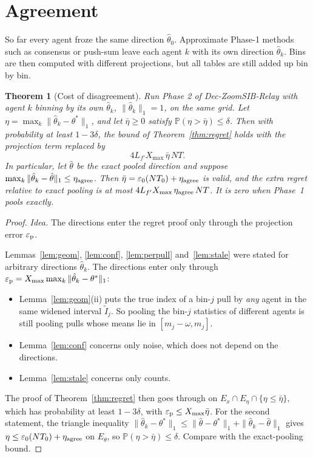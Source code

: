 \documentclass[11pt]{article}
\newtheorem{theorem}{Theorem}
\theoremstyle{definition}
\newcommand{\Prob}{\mathbb{P}}
\newcommand{\Xmax}{X_{\max}}
\newcommand{\eps}{\varepsilon}
\begin{document}
\section{Agreement}\label{sec:agree}

So far every agent froze the same direction $\hat\theta_0$. Approximate Phase-1 methods such as consensus or
push-sum leave each agent $k$ with its own direction $\hat\theta_k$. Bins are then computed with different
projections, but all tables are still added up bin by bin.

\begin{theorem}[Cost of disagreement]\label{thm:agree}
Run Phase 2 of Dec-ZoomSIB-Relay with agent $k$ binning by its own $\hat\theta_k$, $\|\hat\theta_k\|_1=1$, on the same grid.
Let $\eta=\max_k\|\hat\theta_k-\theta^*\|_1$, and let $\bar\eta\ge0$ satisfy $\Prob(\eta>\bar\eta)\le\delta$. Then with
probability at least $1-3\delta$, the bound of Theorem~\ref{thm:regret} holds with the projection term replaced by
\[
4L_{f'}\Xmax\,\bar\eta\,NT .
\]
In particular, let $\hat\theta$ be the exact pooled direction and suppose $\max_k\|\hat\theta_k-\hat\theta\|_1\le\eta_{\rm agree}$.
Then $\bar\eta=\eps_0(NT_0)+\eta_{\rm agree}$ is valid, and the extra regret relative to exact pooling is at most
$4L_{f'}\Xmax\,\eta_{\rm agree}\,NT$. It is zero when Phase~1 pools exactly.
\end{theorem}
\begin{proof}
\emph{Idea.} The directions enter the regret proof only through the projection error $\eps_{\rm p}$.

Lemmas~\ref{lem:geom}, \ref{lem:conf}, \ref{lem:perpull} and~\ref{lem:stale} were stated for arbitrary directions
$\hat\theta_k$. The directions enter only through $\eps_{\rm p}=\Xmax\max_k\|\hat\theta_k-\theta^*\|_1$:
\begin{itemize}[nosep]
\item Lemma~\ref{lem:geom}(ii) puts the true index of a bin-$j$ pull by \emph{any} agent in the same widened interval
$\tilde I_j$. So pooling the bin-$j$ statistics of different agents is still pooling pulls whose means lie in
$[m_j-\omega,m_j]$.
\item Lemma~\ref{lem:conf} concerns only noise, which does not depend on the directions.
\item Lemma~\ref{lem:stale} concerns only counts.
\end{itemize}
The proof of Theorem~\ref{thm:regret} then goes through on $E_x\cap E_\eta\cap\{\eta\le\bar\eta\}$, which has probability
at least $1-3\delta$, with $\eps_{\rm p}\le\Xmax\bar\eta$. For the second statement, the triangle inequality
$\|\hat\theta_k-\theta^*\|_1\le\|\hat\theta-\theta^*\|_1+\|\hat\theta_k-\hat\theta\|_1$ gives $\eta\le\eps_0(NT_0)+\eta_{\rm agree}$
on $E_\theta$, so $\Prob(\eta>\bar\eta)\le\delta$. Compare with the exact-pooling bound.
\end{proof}
\end{document}
